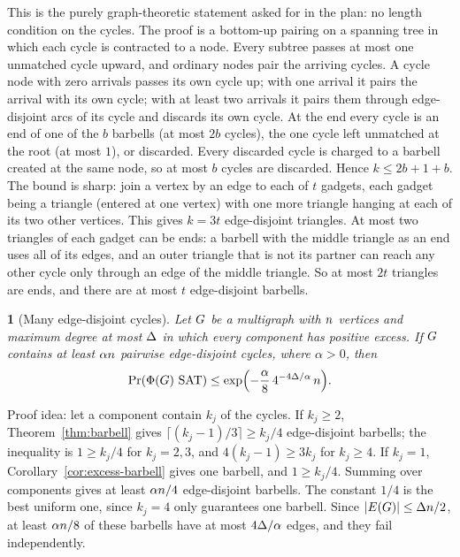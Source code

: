 \documentclass[11pt,a4paper]{article}
\theoremstyle{definition}
\theoremstyle{remark}
\theoremstyle{plain}
\newcommand{\restatedname}{}
\newtheorem*{restatedthm}{\restatedname}
\newenvironment{restate}[2]
  {\renewcommand{\restatedname}{#1}\begin{restatedthm}[#2]}
  {\end{restatedthm}}
\theoremstyle{definition}
\begin{document}
\noindent This is the purely graph-theoretic statement asked for in the plan:
no length condition on the cycles. The proof is a bottom-up pairing on a
spanning tree in which each cycle is contracted to a node. Every subtree
passes at most one unmatched cycle upward, and ordinary nodes pair the
arriving cycles. A cycle node with zero arrivals passes its own cycle up;
with one arrival it pairs the arrival with its own cycle; with at least two
arrivals it pairs them through edge-disjoint arcs of its cycle and discards
its own cycle. At the end every cycle is an end of one of the \(b\)
barbells (at most \(2b\) cycles), the one cycle left unmatched at the root (at
most \(1\)), or discarded. Every discarded cycle is charged to a barbell
created at the same node, so at most \(b\) cycles are discarded. Hence
\(k\le2b+1+b\). The bound is sharp: join a vertex by an edge to each of \(t\)
gadgets, each gadget being a triangle (entered at one vertex) with one more
triangle hanging at each of its two other vertices. This gives \(k=3t\)
edge-disjoint triangles. At most two triangles of each gadget can be ends:
a barbell with the middle triangle as an end uses all of its edges, and an
outer triangle that is not its partner can reach any other cycle only through
an edge of the middle triangle. So at most \(2t\) triangles are ends, and
there are at most \(t\) edge-disjoint barbells.

\begin{restate}{Corollary~\ref{cor:many-cycles}}{Many edge-disjoint cycles}
Let \(G\) be a multigraph with \(n\) vertices and maximum degree at most
\(\Delta\) in which every component has positive excess. If \(G\) contains at
least \(\alpha n\) pairwise edge-disjoint cycles, where \(\alpha>0\), then
\[
  \Prx{\rform{\Gin}\SAT}\le\exp\Bigl(-\frac\alpha8\,4^{-4\degb/\alpha}\,\nvert\Bigr).
\]
\end{restate}

\noindent Proof idea: let a component contain \(k_j\) of the cycles. If
\(k_j\ge2\), Theorem~\ref{thm:barbell} gives
\(\lceil(k_j-1)/3\rceil\ge k_j/4\) edge-disjoint barbells; the inequality is
\(1\ge k_j/4\) for \(k_j=2,3\), and \(4(k_j-1)\ge3k_j\) for \(k_j\ge4\). If
\(k_j=1\), Corollary~\ref{cor:excess-barbell} gives one barbell, and
\(1\ge k_j/4\). Summing over components gives at least \(\alpha n/4\)
edge-disjoint barbells. The constant \(1/4\) is the best uniform one, since
\(k_j=4\) only guarantees one barbell. Since \(|E(G)|\le\Delta n/2\), at least \(\alpha n/8\) of these
barbells have at most \(4\Delta/\alpha\) edges, and they fail independently.
\end{document}
